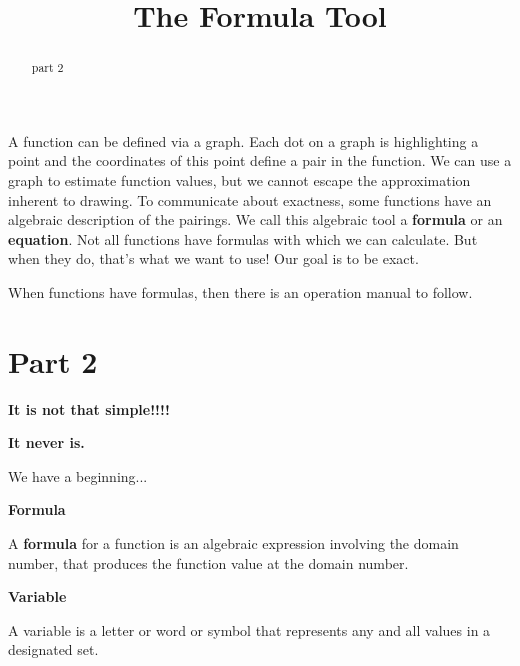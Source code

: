 \documentclass{ximera}
\title{The Formula Tool}
\begin{document}
\begin{abstract}
part 2
\end{abstract}
\maketitle



A function can be defined via a graph. Each dot on a graph is highlighting a point and the coordinates of this point define a pair in the function. We can use a graph to estimate function values, but we cannot escape the approximation inherent to drawing.  To communicate about exactness, some functions have an algebraic description of the pairings.  We call this algebraic tool a \textbf{formula} or an \textbf{equation}. Not all functions have formulas with which we can calculate.  But when they do, that's what we want to use!  Our goal is to be exact. 


When functions have formulas, then there is an operation manual to follow. 





\section*{Part 2}




\begin{center}

\textbf{\textcolor{red!80!black}{It is not that simple!!!!}} 

\textbf{\textcolor{purple!85!blue}{It never is.}}
 
\end{center}





We have a beginning...

\begin{idea}  \textbf{\textcolor{blue!55!black}{Formula}} 

A \textbf{formula} for a function is an algebraic expression involving the domain number, that produces the function value at the domain number.
\end{idea}







\begin{idea}  \textbf{\textcolor{blue!55!black}{Variable}}  

A variable is a letter or word or symbol that represents any and all values in a designated set.


\end{idea}
\end{document}
